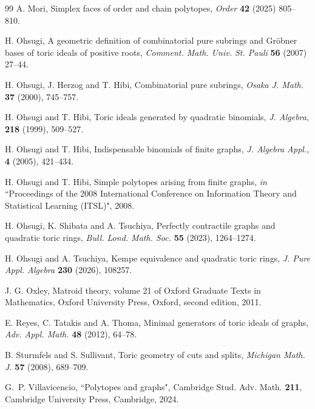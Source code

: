 \documentclass[12pt]{amsart}
\theoremstyle{definition}
\numberwithin{thm}{section}
\numberwithin{equation}{section}
\begin{document}
\begin{thebibliography}{99}
A. Mori,
Simplex faces of order and chain polytopes,
{\it Order} {\bf 42} (2025) 805--810.

H. Ohsugi,
A geometric definition of combinatorial pure subrings and Gr\"obner bases of toric ideals of
positive roots,
{\it Comment. Math. Univ. St. Pauli} {\bf 56} (2007) 27--44.

H. Ohsugi, J. Herzog and T. Hibi,
Combinatorial pure subrings,
\textit{Osaka J. Math.} {\bf 37} (2000), 745--757.


H. Ohsugi and T. Hibi, Toric ideals generated by quadratic binomials, \textit{J. Algebra}, {\bf 218} (1999),
 509--527.


 
H. Ohsugi and T. Hibi, Indispensable binomials of finite graphs, \textit{J. Algebra Appl.}, {\bf 4} (2005), 421--434.

H. Ohsugi and T. Hibi, Simple polytopes arising from finite graphs, 
{\it in} ``Proceedings of the
2008 International Conference on Information Theory and Statistical Learning (ITSL)", 2008.




H. Ohsugi, K. Shibata and A. Tsuchiya,
Perfectly contractile graphs and quadratic toric rings,
{\em Bull. Lond. Math. Soc.} {\bf 55} (2023), 1264--1274.

H. Ohsugi and A. Tsuchiya,
Kempe equivalence and quadratic toric rings,
{\it J. Pure Appl. Algebra} {\bf 230} (2026), 108257.



J. G. Oxley,
Matroid theory, volume 21 of Oxford Graduate Texts in Mathematics, Oxford University Press, Oxford, second edition, 2011.

E. Reyes, C. Tatakis and A. Thoma,
Minimal generators of toric ideals of graphs,
{\it Adv. Appl. Math.} {\bf 48} (2012), 64--78.

B. Sturmfels and S. Sullivant, Toric geometry of cuts and splits,
\textit{Michigan Math. J.} {\bf 57} (2008), 689--709.

G.~P. Villavicencio,
``Polytopes and graphs",
Cambridge Stud. Adv. Math. {\bf 211},
Cambridge University Press, Cambridge, 2024. 


\end{thebibliography}
\end{document}
